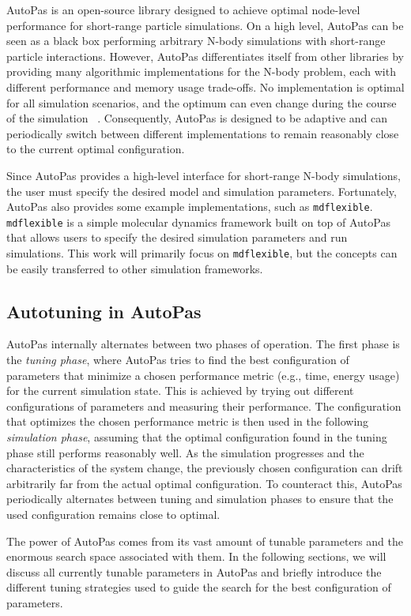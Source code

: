 AutoPas is an open-source library designed to achieve optimal node-level performance for short-range particle simulations. On a high level, AutoPas can be seen as a black box performing arbitrary N-body simulations with short-range particle interactions. However, AutoPas differentiates itself from other libraries by providing many algorithmic implementations for the N-body problem, each with different performance and memory usage trade-offs. No implementation is optimal for all simulation scenarios, and the optimum can even change during the course of the simulation ~\cite{GRATL2022108262}. Consequently, AutoPas is designed to be adaptive and can periodically switch between different implementations to remain reasonably close to the current optimal configuration.

Since AutoPas provides a high-level interface for short-range N-body simulations, the user must specify the desired model and simulation parameters. Fortunately, AutoPas also provides some example implementations, such as \texttt{mdflexible}. \texttt{mdflexible} is a simple molecular dynamics framework built on top of AutoPas that allows users to specify the desired simulation parameters and run simulations. This work will primarily focus on \texttt{mdflexible}, but the concepts can be easily transferred to other simulation frameworks.

\subsection{Autotuning in AutoPas}

AutoPas internally alternates between two phases of operation. The first phase is the \emph{tuning phase}, where AutoPas tries to find the best configuration of parameters that minimize a chosen performance metric (e.g., time, energy usage) for the current simulation state. This is achieved by trying out different configurations of parameters and measuring their performance. The configuration that optimizes the chosen performance metric is then used in the following \emph{simulation phase}, assuming that the optimal configuration found in the tuning phase still performs reasonably well.
As the simulation progresses and the characteristics of the system change, the previously chosen configuration can drift arbitrarily far from the actual optimal configuration. To counteract this, AutoPas periodically alternates between tuning and simulation phases to ensure that the used configuration remains close to optimal.

The power of AutoPas comes from its vast amount of tunable parameters and the enormous search space associated with them. In the following sections, we will discuss all currently tunable parameters in AutoPas and briefly introduce the different tuning strategies used to guide the search for the best configuration of parameters.

